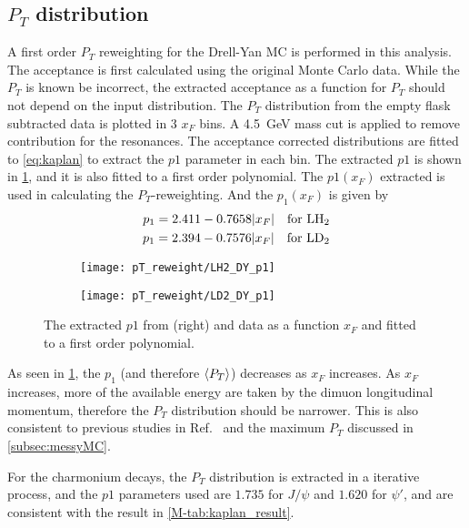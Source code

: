 \documentclass[../main.tex]{subfiles}
\begin{document}
\subsection{\texorpdfstring{$P_T$}{P\_T} distribution}
A first order $P_T$ reweighting for the Drell-Yan MC is performed in this analysis. The acceptance is first
calculated using the original Monte Carlo data. While the $P_T$ is known be incorrect,
the extracted acceptance as a function for $P_T$ should not depend on the input
distribution. The $P_T$ distribution from the empty flask subtracted data
is plotted in 3 $x_F$ bins. A \SI{4.5}{\GeV} mass cut is applied to remove contribution for the
resonances. The acceptance corrected distributions are fitted to \cref{eq:kaplan} to
extract the $p1$ parameter in each bin. The extracted $p1$ is shown in \cref{fig:p1_xF_DY},
and it is also fitted to a first order polynomial. The $p1(x_F)$ extracted is used in calculating
the $P_T$-reweighting. And the $p_1\left(x_F\right)$ is given by
\begin{equation}
	\begin{split}
		p_1 = 2.411 - 0.7658 \abs{x_F} \quad \text{for \ce{LH_2}}\\
		p_1 = 2.394 - 0.7576 \abs{x_F} \quad \text{for \ce{LD_2}}
	\end{split}
\end{equation}

\begin{figure}[h!]
	\centering
	\begin{subfigure}{0.45\linewidth}
		\texttt{[image: pT\_reweight/LH2\_DY\_p1]}
	\end{subfigure}
	\begin{subfigure}{0.45\linewidth}
		\texttt{[image: pT\_reweight/LD2\_DY\_p1]}
	\end{subfigure}
	\caption{The extracted $p1$ from (right) and  data as a function
		$x_F$ and fitted to a first order polynomial.}
	\label{fig:p1_xF_DY}
\end{figure}
As seen in \cref{fig:p1_xF_DY}, the $p_1$ (and therefore $\expval{P_T}$) decreases as $x_F$ increases.
As $x_F$ increases, more of the available energy are taken by the dimuon longitudinal momentum,
therefore the $P_T$ distribution should be narrower.
This is also consistent to previous studies in Ref.~\cite{prasad2020} and the maximum $P_T$ discussed in
\cref{subsec:messyMC}.

For the charmonium decays, the $P_T$ distribution is extracted in a iterative process, and the $p1$
parameters used are $1.735$ for $J/\psi$ and $1.620$ for $\psi'$, and are consistent with the result in
\cref{M-tab:kaplan_result}.
\end{document}
